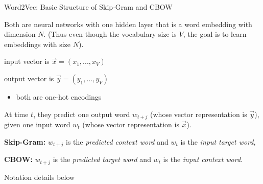 \begin{frame}{Word2Vec: Basic Structure of Skip-Gram and CBOW}
    
    \begin{itemizeSpaced}{5pt}
        \pinkbox Both are neural networks with one hidden layer that is a word embedding with dimension $N$. (Thus even though the vocabulary size is $V$, the goal is to learn embeddings with size $N$).
        
        \item input vector is $\overrightarrow{x} = (x_1,..., x_V)$ 
        
        \item output vector is $\overrightarrow{y} = (y_1,...,y_V)$ 
        
        \begin{itemize}
            \item both are one-hot encodings
        \end{itemize}
        
        \item At time $t$, they predict one output word $w_{t+j}$ (whose vector representation is $\overrightarrow{y}$), given one input word $w_t$ (whose vector representation is $\overrightarrow{x}$).
        
        
        \item \textbf{Skip-Gram: }$w_{t+j}$ is the \emph{predicted context word} and $w_t$ is the \emph{input target word},
        
        \item \textbf{CBOW: } $w_{t+j}$ is the \emph{predicted target word} and $w_t$ is the \emph{input context word}.
        
        
        \item Notation details below\footnotemark
    
    \end{itemizeSpaced}

    
\end{frame}



